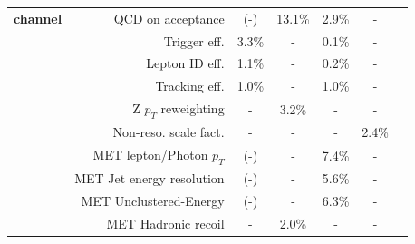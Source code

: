 \begin{table}[htbp]
\begin{center}
\begin{footnotesize}
\begin{tabular}{l r c c c c c }
{\bf channel}&QCD on acceptance			&  	(-)	&	13.1\%		&	2.9\%			&	-						\\ 
{}	&	Trigger eff.			&	3.3\%	&	-		&	0.1\%			&	-						\\
{}	&	Lepton ID eff.			&	1.1\%	&	-		&	0.2\%			&	-						\\
{}	&	Tracking eff.			&	1.0\%	&	-		&	1.0\%			&	-					\\
{}	&	Z $p_T$ reweighting		&	-	&	3.2\%		&	-			&	-						\\
{}	&	Non-reso. scale fact.		&	-	&	-		&	-			&	2.4\%					\\ 
{}	&	MET lepton/Photon $p_T$		&	(-)	&	-		&	7.4\%			&	-						\\
{}	&	MET Jet energy resolution	&	(-)	&	-		&	5.6\%			&	-						\\
{}	&	MET Unclustered-Energy		&	(-)	&	-		&	6.3\%			&	-						\\
{}	&	MET Hadronic recoil		&	-	&	2.0\%		&	-			&	-						\\
%
\hline\hline
\end{tabular}
\end{footnotesize}
\end{center}
\end{table}

